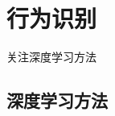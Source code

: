 \chapter{行为识别}\label{action-recognition}

\begin{intro}
	关注深度学习方法
\end{intro}

\section{深度学习方法}


























